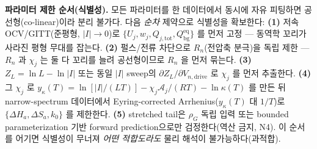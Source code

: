 \documentclass[11pt,a4paper]{article}
\newcommand{\eq}{\mathrm{eq}}
\newcommand{\drive}{\mathrm{drive}}
\newcommand{\bg}{\mathrm{bg}}
\newcommand{\tot}{\mathrm{tot}}
\begin{document}
\textbf{파라미터 제한 순서(식별성).} 모든 파라미터를 한 데이터에서 동시에 자유 피팅하면 공선형(co-linear)이라
분리 불가다. 다음 \emph{순차} 제약으로 식별성을 확보한다: \textbf{(1)} 저속 OCV/GITT(준평형, $|I|\to0$)로
$\{U_j,w_j,Q_{j,\tot},Q_\bg^{\eq}\}$ 를 먼저 고정 — 동역학 꼬리가 사라진 평형 무대를 잡는다. \textbf{(2)} 펄스/전류
차단으로 $R_n$(전압축 분극)을 독립 제한 — $R_n$ 과 $\chi_j$ 는 둘 다 꼬리를 늘려 공선형이므로 $R_n$ 을 먼저
묶는다. \textbf{(3)} $Z_L=\ln L-\ln|I|$ 또는 동일 $|I|$ sweep의 $\partial Z_L/\partial V_{n,\drive}$ 로 $\chi_j$ 를 먼저 추출한다.
\textbf{(4)} 그 $\chi_j$ 로 $y_\kappa(T)=\ln[|I|/(LT)]-\chi_j\mathcal A_j/(RT)-\ln\kappa(T)$ 를 만든 뒤 narrow-spectrum 데이터에서
Eyring-corrected Arrhenius($y_\kappa(T)$ 대 $1/T$)로
$\{\Delta H_a,\Delta S_a,k_0\}$ 를 제한한다. \textbf{(5)} stretched tail은 $\rho_G$ 독립 입력 또는 bounded parameterization 기반 forward prediction으로만 검정한다(역산 금지, N4).
이 순서를 어기면 식별성이 무너져 \emph{어떤 적합도라도} 물리 해석이 불가능하다(과적합).

\end{document}
